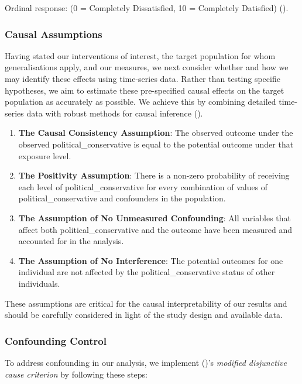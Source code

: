 \documentclass[
  single column]{article}
\begin{document}
Ordinal response: (0 = Completely Dissatisfied, 10 = Completely
Datisfied) ().

\subsubsection{Causal Assumptions}\label{causal-assumptions}

Having stated our interventions of interest, the target population for
whom generalisations apply, and our measures, we next consider whether
and how we may identify these effects using time-series data. Rather
than testing specific hypotheses, we aim to estimate these pre-specified
causal effects on the target population as accurately as possible. We
achieve this by combining detailed time-series data with robust methods
for causal inference ().

\begin{enumerate}
\def\labelenumi{\arabic{enumi}.}
\item
  \textbf{The Causal Consistency Assumption}: The observed outcome under
  the observed political\_conservative is equal to the potential outcome
  under that exposure level.
\item
  \textbf{The Positivity Assumption}: There is a non-zero probability of
  receiving each level of political\_conservative for every combination
  of values of political\_conservative and confounders in the
  population.
\item
  \textbf{The Assumption of No Unmeasured Confounding}: All variables
  that affect both political\_conservative and the outcome have been
  measured and accounted for in the analysis.
\item
  \textbf{The Assumption of No Interference}: The potential outcomes for
  one individual are not affected by the political\_conservative status
  of other individuals.
\end{enumerate}

These assumptions are critical for the causal interpretability of our
results and should be carefully considered in light of the study design
and available data.

\subsubsection{Confounding Control}\label{confounding-control}

To address confounding in our analysis, we implement
()'s \emph{modified
disjunctive cause criterion} by following these steps:
\end{document}
